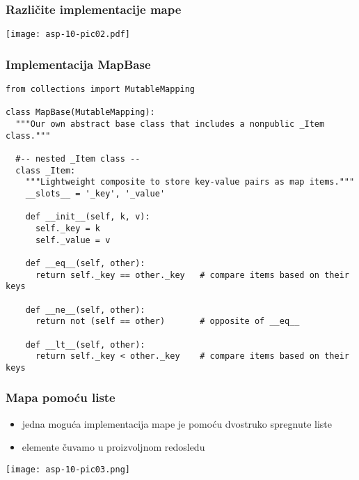 \documentclass[compress]{beamer}
\begin{document}
\begin{frame}[fragile]
  \frametitle{Različite implementacije mape}
  \begin{center}
    \texttt{[image: asp-10-pic02.pdf]}
  \end{center}
\end{frame}

\begin{frame}
  \frametitle{Implementacija MapBase}
\begin{verbatim}
from collections import MutableMapping

class MapBase(MutableMapping):
  """Our own abstract base class that includes a nonpublic _Item class."""

  #-- nested _Item class --
  class _Item:
    """Lightweight composite to store key-value pairs as map items."""
    __slots__ = '_key', '_value'

    def __init__(self, k, v):
      self._key = k
      self._value = v

    def __eq__(self, other):               
      return self._key == other._key   # compare items based on their keys

    def __ne__(self, other):
      return not (self == other)       # opposite of __eq__

    def __lt__(self, other):               
      return self._key < other._key    # compare items based on their keys
\end{verbatim}
\end{frame}

\begin{frame}[fragile]
  \frametitle{Mapa pomoću liste}
  \begin{itemize}
    \item jedna moguća implementacija mape je pomoću dvostruko spregnute liste 
    \item elemente čuvamo u proizvoljnom redosledu
  \end{itemize}
  \begin{center}
    \texttt{[image: asp-10-pic03.png]}
  \end{center}
\end{frame}
\end{document}

